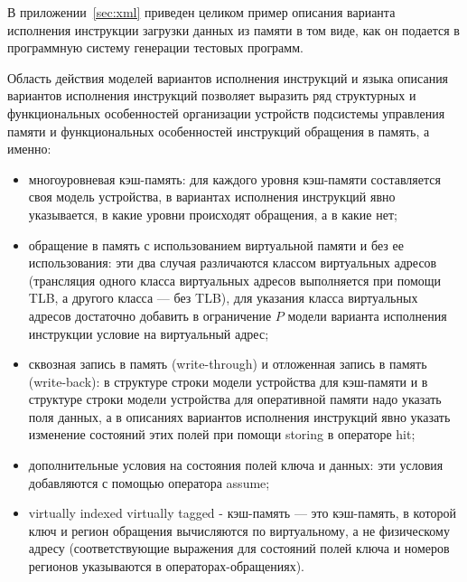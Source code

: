 В приложении~\ref{sec:xml} приведен целиком пример описания варианта исполнения инструкции загрузки данных из памяти в том виде, как он подается в программную систему генерации тестовых программ.

Область действия моделей вариантов исполнения инструкций и языка описания вариантов исполнения инструкций позволяет выразить ряд структурных и функциональных особенностей организации устройств подсистемы управления памяти  и функциональных особенностей инструкций обращения в память, а именно:
\begin{itemize}
    \item многоуровневая кэш-память: для каждого уровня кэш-памяти составляется своя модель устройства, в вариантах исполнения инструкций явно указывается, в какие уровни происходят обращения, а в какие нет;
    \item обращение в память с использованием виртуальной памяти и без ее использования: эти два случая различаются классом виртуальных адресов (трансляция одного класса виртуальных адресов выполняется при помощи TLB, а другого класса --- без TLB), для указания класса виртуальных адресов достаточно добавить в ограничение $P$ модели варианта исполнения инструкции условие на виртуальный адрес;
    \item сквозная запись в память (write-through) и отложенная запись в память (write-back): в структуре строки модели устройства для кэш-памяти и в структуре строки модели устройства для оперативной памяти надо указать поля данных, а в описаниях вариантов исполнения инструкций явно указать изменение состояний этих полей при помощи storing в операторе hit;
    \item дополнительные условия на состояния полей ключа и данных: эти условия добавляются с помощью оператора assume;
    \item virtually indexed virtually tagged - кэш-память --- это кэш-память, в которой ключ и регион обращения вычисляются по виртуальному, а не физическому адресу (соответствующие выражения для состояний полей ключа и номеров регионов указываются в операторах-обращениях).
\end{itemize}

